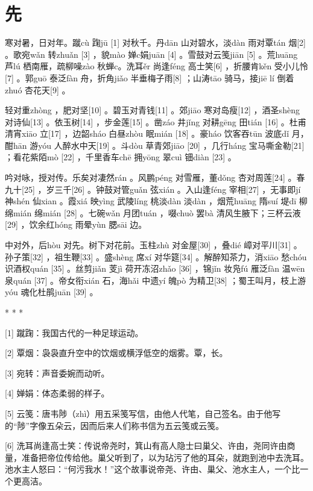 \documentclass[12pt,UTF8]{ctexbook}
\begin{document}
\setcounter{chapter}{0}

\chapter{先}


寒对暑，日对年。蹴cù 踘jū [1] 对秋千。丹dān 山对碧水，淡dàn 雨对覃tán 烟[2] 。歌宛wǎn 转zhuǎn [3] ，貌mào 婵c娟juān [4] 。雪鼓对云笺jiān [5] 。荒huāng 芦lú 栖南雁，疏柳噪zào 秋蝉c。洗耳ěr 尚逢féng 高士笑[6] ，折腰肯kěn 受小儿怜[7] 。郭guō 泰泛fàn 舟，折角jiǎo 半垂梅子雨[8] ；山涛tāo 骑马，接jiē lí 倒着zhuó 杏花天[9] 。

轻对重zhòng ，肥对坚[10] 。碧玉对青钱[11] 。郊jiāo 寒对岛瘦[12] ，酒圣shèng 对诗仙[13] 。依玉树[14] ，步金莲[15] 。凿záo 井jǐng 对耕gēng 田tián [16] 。杜甫清宵xiāo 立[17] ，边韶sháo 白昼zhòu 眠mián [18] 。豪háo 饮客吞tūn 波底dǐ 月，酣hān 游yóu 人醉水中天[19] 。斗dòu 草青郊jiāo [20] ，几行háng 宝马嘶金勒[21] ；看花紫陌mò [22] ，千里香车chē 拥yōng 翠cuì 钿diàn [23] 。

吟对咏，授对传。乐矣对凄然rán 。风鹏péng 对雪雁，董dǒng 杏对周莲[24] 。春九十[25] ，岁三千[26] 。钟鼓对管guǎn 弦xián 。入山逢féng 宰相[27] ，无事即jí 神shén 仙xian 。霞xiá 映yìng 武陵líng 桃淡dàn 淡dàn ，烟荒huāng 隋suí 堤dī 柳绵mián 绵mián [28] 。七碗wǎn 月团tuán ，啜chuò 罢bà 清风生腋下；三杯云液[29] ，饮余红hóng 雨晕yùn 腮sāi 边。

中对外，后hòu 对先。树下对花前。玉柱zhù 对金屋[30] ，叠dié 嶂对平川[31] 。孙子策[32] ，祖生鞭[33] 。盛shèng 席xí 对华筵[34] 。解醉知茶力，消xiāo 愁chóu 识酒权quán [35] 。丝剪jiǎn 芰jì 荷开冻沼zhǎo [36] ，锦jǐn 妆凫fú 雁泛fàn 温wēn 泉quán [37] 。帝女衔xián 石，海hǎi 中遗yí 魄pò 为精卫[38] ；蜀王叫月，枝上游yóu 魂化杜鹃juān [39] 。



* * *



[1] 蹴踘：我国古代的一种足球运动。

[2] 覃烟：袅袅直升空中的饮烟或横浮低空的烟雾。覃，长。

[3] 宛转：声音委婉而动听。

[4] 婵娟：体态柔弱的样子。

[5] 云笺：唐韦陟（zhì）用五采笺写信，由他人代笔，自己签名。由于他写的“陟”字像五朵云，因而后来人们称书信为五云笺或云笺。

[6] 洗耳尚逢高士笑：传说帝尧时，箕山有高人隐士曰巢父、许由，尧同许由商量，准备把帝位传给他。巢父听到了，以为玷污了他的耳朵，就跑到池中去洗耳。池水主人怒曰：“何污我水！”这个故事说帝尧、许由、巢父、池水主人，一个比一个更高洁。
\end{document}

